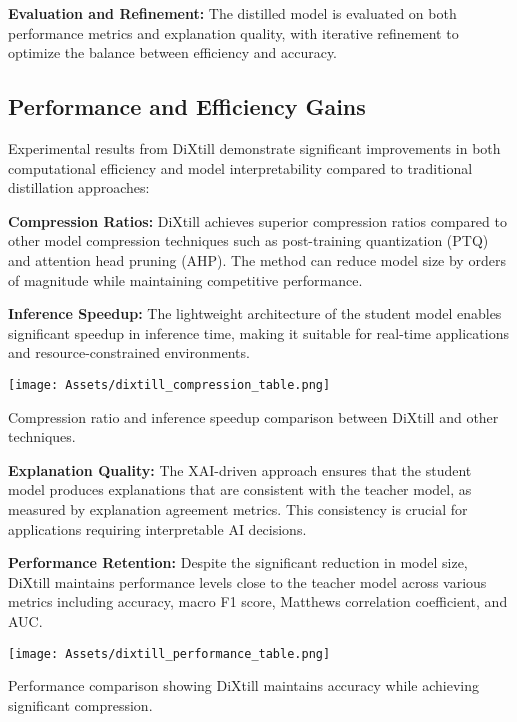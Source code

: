 \textbf{Evaluation and Refinement:} The distilled model is evaluated on both performance metrics and explanation quality, with iterative refinement to optimize the balance between efficiency and accuracy.



\subsection{Performance and Efficiency Gains}

Experimental results from DiXtill demonstrate significant improvements in both computational efficiency and model interpretability compared to traditional distillation approaches:


\textbf{Compression Ratios:} DiXtill achieves superior compression ratios compared to other model compression techniques such as post-training quantization (PTQ) and attention head pruning (AHP). The method can reduce model size by orders of magnitude while maintaining competitive performance.

\textbf{Inference Speedup:} The lightweight architecture of the student model enables significant speedup in inference time, making it suitable for real-time applications and resource-constrained environments.

\begin{table}[H]
    \centering
    \texttt{[image: Assets/dixtill\_compression\_table.png]}
    \caption{Compression ratio and inference speedup comparison between DiXtill and other techniques.\cite{XaiDrivenKnowledge}}
    \label{tab:dixtill_compression}
\end{table}

\textbf{Explanation Quality:} The XAI-driven approach ensures that the student model produces explanations that are consistent with the teacher model, as measured by explanation agreement metrics. This consistency is crucial for applications requiring interpretable AI decisions.



\textbf{Performance Retention:} Despite the significant reduction in model size, DiXtill maintains performance levels close to the teacher model across various metrics including accuracy, macro F1 score, Matthews correlation coefficient, and AUC.

\begin{table}[H]
    \centering
    \texttt{[image: Assets/dixtill\_performance\_table.png]}
    \caption{Performance comparison showing DiXtill maintains accuracy while achieving significant compression.\cite{XaiDrivenKnowledge}}
    \label{tab:dixtill_performance}
\end{table}

